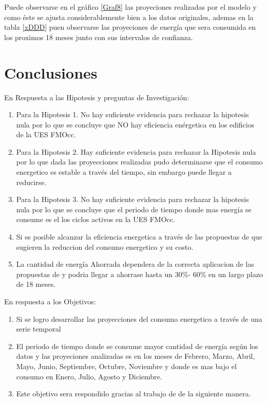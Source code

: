 \documentclass[12pt,letterpaper]{report}
\begin{document}
Puede observarse en el gráfico \ref{Graf8} las proyeciones realizadas por el modelo y como éste se ajusta considerablemente bien a los datos originales, ademas en la tabla \ref{xDDD} puen observarse las proyeciones de energía que sera consumida en los proximos 18 meses junto con sus intervalos de confianza.


\chapter*{Conclusiones}
En Respuesta a las Hipotesis y preguntas de Investigación:
\begin{enumerate}
  \item Para la Hipotesis 1. No hay suficiente evidencia para rechazar la hipotesis nula por lo que se concluye que NO hay eficiencia enérgetica en los edificios de la UES FMOcc.
  \item Para la Hipotesis 2. Hay suficiente evidencia para rechazar la Hipotesis nula por lo que dada las proyecciones realizadas pudo determinarse que el consumo energetico es estable a través del tiempo, sin embargo puede llegar a reducirse.
  \item Para la Hipotesis 3. No hay suficiente evidencia para rechazar la hipotesis nula por lo que se concluye que el periodo de tiempo donde mas energía se consume es el los ciclos activos en la UES FMOcc.
  \item Si es posible alcanzar la eficiencia energetica a través de las propuestas de \cite{ANelson} que sugieren la reduccion del consumo energetico y su costo.
  \item La cantidad de energía Ahorrada dependera de la correcta aplicacion de las propuestas de \cite{ANelson} y podria llegar a ahorrase hasta un 30\%- 60\% en un largo plazo de 18 meses.
\end{enumerate}

En respuesta a los Objetivos:

\begin{enumerate}
  \item Si se logro desarrollar las proyecciones del consumo energetico a través de una serie temporal
  \item El periodo de tiempo donde se consume mayor cantidad de energía según los datos y las proyeciones analizadas es en los meses de Febrero, Marzo, Abril, Mayo, Junio, Septiembre, Octubre, Noviembre y donde es mas bajo el consumo en Enero, Julio, Agosto y Diciembre.
  \item Este objetivo sera respondido gracias al trabajo de \cite{ANelson} de la siguiente manera.
\end{enumerate}
\end{document}
